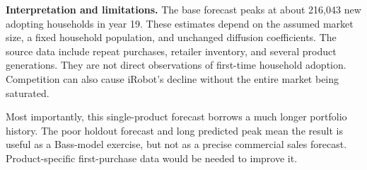 \documentclass[11pt,a4paper]{article}
\begin{document}
\textbf{Interpretation and limitations.} The base forecast peaks at about 216,043 new adopting households in year 19. These estimates depend on the assumed market size, a fixed household population, and unchanged diffusion coefficients. The source data include repeat purchases, retailer inventory, and several product generations. They are not direct observations of first-time household adoption. Competition can also cause iRobot's decline without the entire market being saturated.

Most importantly, this single-product forecast borrows a much longer portfolio history. The poor holdout forecast and long predicted peak mean the result is useful as a Bass-model exercise, but not as a precise commercial sales forecast. Product-specific first-purchase data would be needed to improve it.
\end{document}
